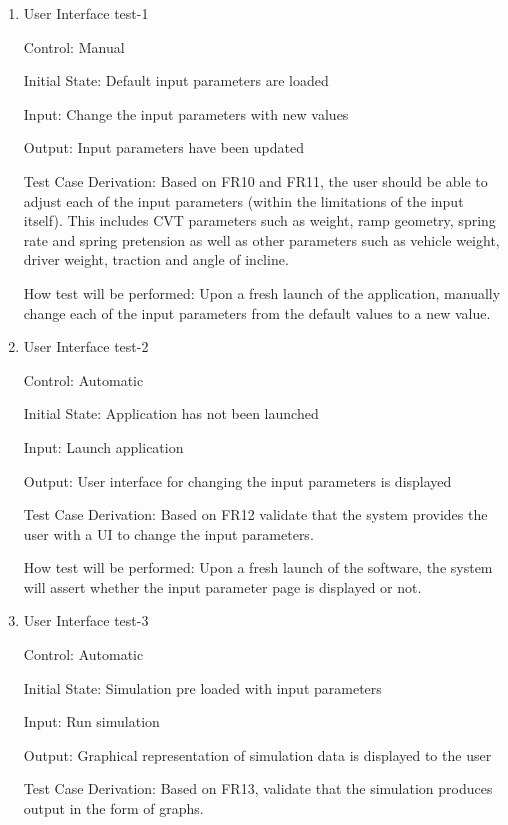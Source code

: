\documentclass[12pt, titlepage]{article}
\begin{document}
\begin{enumerate}
  \item{User Interface test-1\\}
  
  Control: Manual

  Initial State: Default input parameters are loaded
            
  Input: Change the input parameters with new values
            
  Output: Input parameters have been updated 
  
  Test Case Derivation: Based on FR10 and FR11, the user should be able to adjust each of the input parameters (within the limitations of the input itself).
  This includes CVT parameters such as weight, ramp geometry, spring rate and spring pretension as well as other parameters such as vehicle weight, driver weight, traction and angle of incline. 
  
  How test will be performed: Upon a fresh launch of the application, manually change each of the input parameters from the default values to a new value. 
             
  \item{User Interface test-2\\}
 
  Control: Automatic
            
  Initial State: Application has not been launched
            
  Input: Launch application
            
  Output: User interface for changing the input parameters is displayed
  
  Test Case Derivation: Based on FR12 validate that the system provides the user with a UI to change the input parameters.
  
  How test will be performed: Upon a fresh launch of the software, the system will assert whether the input parameter page is displayed or not. 
  \item {User Interface test-3\\}
  
  Control: Automatic
            
  Initial State: Simulation pre loaded with input parameters
            
  Input: Run simulation 
            
  Output: Graphical representation of simulation data is displayed to the user
  
  Test Case Derivation: Based on FR13, validate that the simulation produces output in the form of graphs.
  

\end{enumerate}
\end{document}

